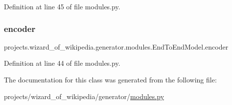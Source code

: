 Definition at line 45 of file modules.\+py.

\mbox{\label{classprojects_1_1wizard__of__wikipedia_1_1generator_1_1modules_1_1EndToEndModel_a4d6ecf9a0df55b1124ffd4eec6bfb018}} 
\subsubsection{\texorpdfstring{encoder}{encoder}}
{\footnotesize\ttfamily projects.\+wizard\+\_\+of\+\_\+wikipedia.\+generator.\+modules.\+End\+To\+End\+Model.\+encoder}



Definition at line 44 of file modules.\+py.



The documentation for this class was generated from the following file\+:\begin{DoxyCompactItemize}
\item 
projects/wizard\+\_\+of\+\_\+wikipedia/generator/\hyperlink{projects_2wizard__of__wikipedia_2generator_2modules_8py}{modules.\+py}\end{DoxyCompactItemize}
